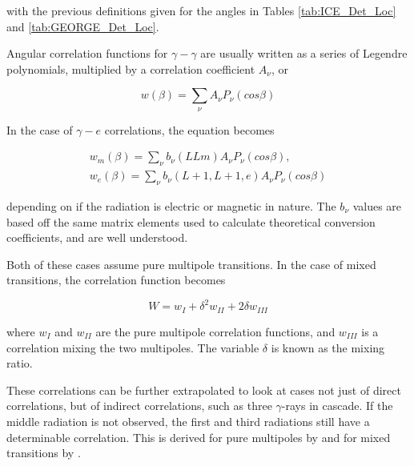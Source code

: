 with the previous definitions given for the angles in Tables \ref{tab:ICE_Det_Loc} and \ref{tab:GEORGE_Det_Loc}.



Angular correlation functions for $\gamma-\gamma$ are usually written as a series of Legendre polynomials, multiplied by a correlation coefficient $A_\nu$, or

\begin{equation}
    w(\beta) = \sum_\nu A_\nu P_\nu(cos\beta)
    \label{eq:ge_corr}
\end{equation}

In the case of $\gamma-e$ correlations, the equation becomes 

\begin{equation}
    \begin{split}
        w_m(\beta) = \sum_\nu b_\nu(LLm) A_\nu P_\nu(cos\beta), \\
        w_e(\beta) = \sum_\nu b_\nu(L+1,L+1,e) A_\nu P_\nu(cos\beta)
        \label{eq:e_corr}
    \end{split}
\end{equation}

depending on if the radiation is electric or magnetic in nature. The $b_\nu$ values are based off the same matrix elements used to calculate theoretical conversion coefficients, and are well understood\citep{rose51:_internal_conversion, rose52:_internal_conversion}.

Both of these cases assume pure multipole transitions. In the case of mixed transitions, the correlation function becomes

\begin{equation}
    W = w_I + \delta^2 w_{II} + 2\delta w_{III}
    \label{eq:mixed_corr}
\end{equation}

where $w_I$ and $w_{II}$ are the pure multipole correlation functions, and $w_{III}$ is a correlation mixing the two multipoles. The variable $\delta$ is known as the mixing ratio. 

These correlations can be further extrapolated to look at cases not just of direct correlations, but of indirect correlations, such as three $\gamma$-rays in cascade. If the middle radiation is not observed, the first and third radiations still have a determinable correlation. This is derived for pure multipoles by \citep{biedenharn53:_theory_angular_corr} and for mixed transitions by \citep{rose53:_angular_corr_supp,osborn53:_angular_corr_3}.

